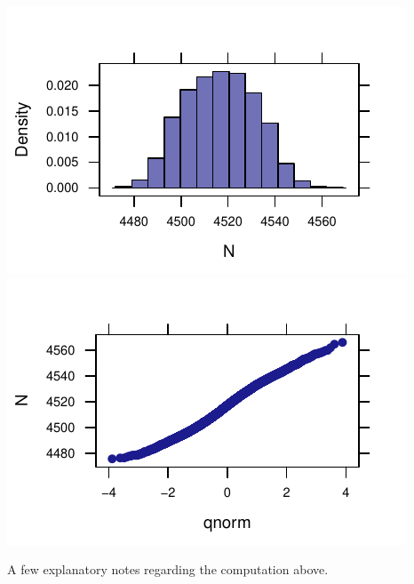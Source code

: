 \documentclass[twoside]{book}\usepackage[]{graphicx}\usepackage[]{xcolor}
\makeatletter
\def\maxwidth{ %
  \ifdim\Gin@nat@width>\linewidth
    \linewidth
  \else
    \Gin@nat@width
  \fi
}
\newenvironment{knitrout}{}{} %
\makeatother
\begin{document}
\begin{knitrout}
{\centering \includegraphics[width=\maxwidth]{figures/fig-dimes-sim-1} 
\includegraphics[width=\maxwidth]{figures/fig-dimes-sim-2} 

}



\end{knitrout}
A few explanatory notes regarding the computation above.
\end{document}
